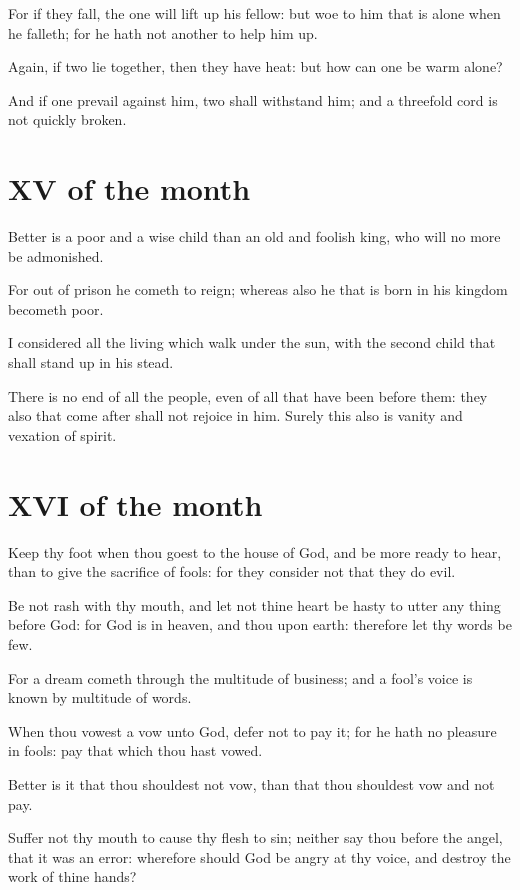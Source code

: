 For if they fall, the one will lift up his fellow: but woe to him that is alone when he falleth; for he hath not another to help him up.

Again, if two lie together, then they have heat: but how can one be warm alone?

And if one prevail against him, two shall withstand him; and a threefold cord is not quickly broken.

\section*{XV of the month}

Better is a poor and a wise child than an old and foolish king, who will no more be admonished.

For out of prison he cometh to reign; whereas also he that is born in his kingdom becometh poor.

I considered all the living which walk under the sun, with the second child that shall stand up in his stead.

There is no end of all the people, even of all that have been before them: they also that come after shall not rejoice in him. Surely this also is vanity and vexation of spirit.

\section*{XVI of the month}

Keep thy foot when thou goest to the house of God, and be more ready to hear, than to give the sacrifice of fools: for they consider not that they do evil.

Be not rash with thy mouth, and let not thine heart be hasty to utter any thing before God: for God is in heaven, and thou upon earth: therefore let thy words be few.

For a dream cometh through the multitude of business; and a fool's voice is known by multitude of words.

When thou vowest a vow unto God, defer not to pay it; for he hath no pleasure in fools: pay that which thou hast vowed.

Better is it that thou shouldest not vow, than that thou shouldest vow and not pay.

Suffer not thy mouth to cause thy flesh to sin; neither say thou before the angel, that it was an error: wherefore should God be angry at thy voice, and destroy the work of thine hands?

